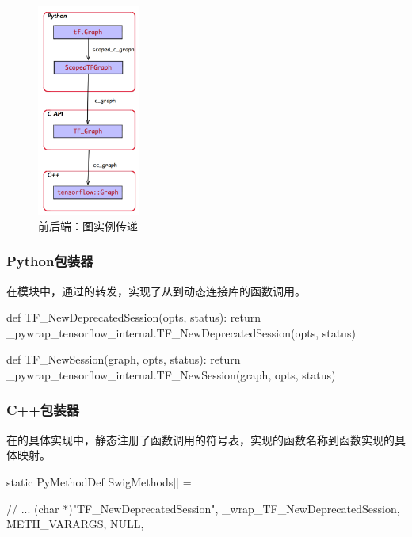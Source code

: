 \begin{content}
\begin{figure}[H]
\centering
\includegraphics[width=0.3\textwidth]{figures/tf-graph-inst.png}
\caption{前后端：图实例传递}
 \label{fig:tf-graph-inst}
\end{figure}

\subsubsection{Python包装器}

在模块中，通过的转发，实现了从到动态连接库的函数调用。

\begin{leftbar}
\begin{python}[caption={tensorflow/bazel-bin/tensorflow/python/pywrap\_tensorflow\_internal.py}]
def TF_NewDeprecatedSession(opts, status):
  return _pywrap_tensorflow_internal.TF_NewDeprecatedSession(opts, status)

def TF_NewSession(graph, opts, status):
  return _pywrap_tensorflow_internal.TF_NewSession(graph, opts, status)
\end{python}
\end{leftbar}

\subsubsection{C++包装器}

在的具体实现中，静态注册了函数调用的符号表，实现的函数名称到\cpp{}函数实现的具体映射。

\begin{leftbar}
\begin{c++}[caption={tensorflow/bazel-bin/tensorflow/python/pywrap\_tensorflow\_internal.cc}]
static PyMethodDef SwigMethods[] = {
  // ...
  { (char *)"TF_NewDeprecatedSession", 
    _wrap_TF_NewDeprecatedSession, METH_VARARGS, NULL},

}
\end{c++}
\end{leftbar}
\end{content}
